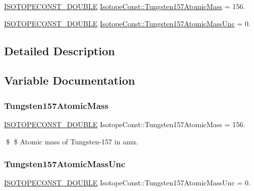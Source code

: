 \begin{DoxyCompactItemize}
\item 
\mbox{\hyperlink{group___isotope_const-_macros_ga8f45a7272ce02c0b4c65c44636ed719a}{I\+S\+O\+T\+O\+P\+E\+C\+O\+N\+S\+T\+\_\+\+D\+O\+U\+B\+LE}} \mbox{\hyperlink{group___isotope_const-_tungsten-_w157_gae182e87619b6f3e37b1a47f24f2d7b9f}{Isotope\+Const\+::\+Tungsten157\+Atomic\+Mass}} = 156.
\item 
\mbox{\hyperlink{group___isotope_const-_macros_ga8f45a7272ce02c0b4c65c44636ed719a}{I\+S\+O\+T\+O\+P\+E\+C\+O\+N\+S\+T\+\_\+\+D\+O\+U\+B\+LE}} \mbox{\hyperlink{group___isotope_const-_tungsten-_w157_gadefa2eaba9e38906ef81a4b557de3dbf}{Isotope\+Const\+::\+Tungsten157\+Atomic\+Mass\+Unc}} = 0.
\end{DoxyCompactItemize}


\subsection{Detailed Description}


\subsection{Variable Documentation}
\mbox{\label{group___isotope_const-_tungsten-_w157_gae182e87619b6f3e37b1a47f24f2d7b9f}} 
\subsubsection{\texorpdfstring{Tungsten157\+Atomic\+Mass}{Tungsten157AtomicMass}}
{\footnotesize\ttfamily \mbox{\hyperlink{group___isotope_const-_macros_ga8f45a7272ce02c0b4c65c44636ed719a}{I\+S\+O\+T\+O\+P\+E\+C\+O\+N\+S\+T\+\_\+\+D\+O\+U\+B\+LE}} Isotope\+Const\+::\+Tungsten157\+Atomic\+Mass = 156.}

\$ \$ Atomic mass of Tungsten-\/157 in amu. \mbox{\label{group___isotope_const-_tungsten-_w157_gadefa2eaba9e38906ef81a4b557de3dbf}} 
\subsubsection{\texorpdfstring{Tungsten157\+Atomic\+Mass\+Unc}{Tungsten157AtomicMassUnc}}
{\footnotesize\ttfamily \mbox{\hyperlink{group___isotope_const-_macros_ga8f45a7272ce02c0b4c65c44636ed719a}{I\+S\+O\+T\+O\+P\+E\+C\+O\+N\+S\+T\+\_\+\+D\+O\+U\+B\+LE}} Isotope\+Const\+::\+Tungsten157\+Atomic\+Mass\+Unc = 0.}

